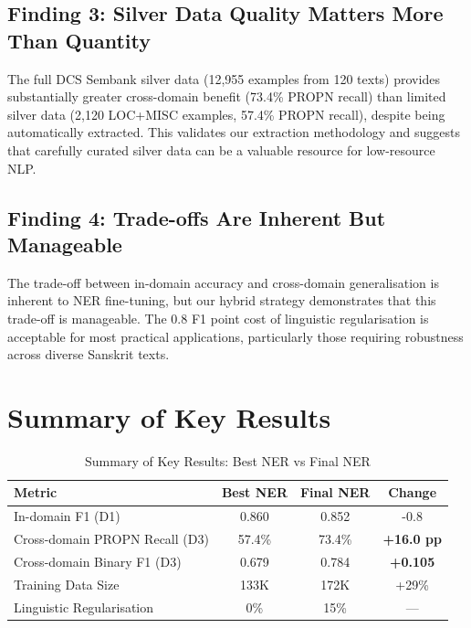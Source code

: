 \subsection{Finding 3: Silver Data Quality Matters More Than Quantity}

The full DCS Sembank \cite{hellwig2010dcs} silver data (12,955 examples from 120 texts) provides substantially greater cross-domain benefit (73.4\% PROPN recall) than limited silver data (2,120 LOC+MISC examples, 57.4\% PROPN recall), despite being automatically extracted. This validates our extraction methodology and suggests that carefully curated silver data can be a valuable resource for low-resource NLP.

\subsection{Finding 4: Trade-offs Are Inherent But Manageable}

The trade-off between in-domain accuracy and cross-domain generalisation is inherent to NER fine-tuning, but our hybrid strategy demonstrates that this trade-off is manageable. The 0.8 F1 point cost of linguistic regularisation is acceptable for most practical applications, particularly those requiring robustness across diverse Sanskrit texts.

\section{Summary of Key Results}

\begin{table}[htbp]
    \centering
    \caption{Summary of Key Results: Best NER vs Final NER}
    \label{tab:summary_results}
    \begin{tabular}{lccc}
        \toprule
        \textbf{Metric} & \textbf{Best NER} & \textbf{Final NER} & \textbf{Change} \\
        \midrule
        In-domain F1 (D1) & 0.860 & 0.852 & -0.8 \\
        Cross-domain PROPN Recall (D3) & 57.4\% & 73.4\% & \textbf{+16.0 pp} \\
        Cross-domain Binary F1 (D3) & 0.679 & 0.784 & \textbf{+0.105} \\
        Training Data Size & 133K & 172K & +29\% \\
        Linguistic Regularisation & 0\% & 15\% & — \\
        \bottomrule
    \end{tabular}
\end{table}

